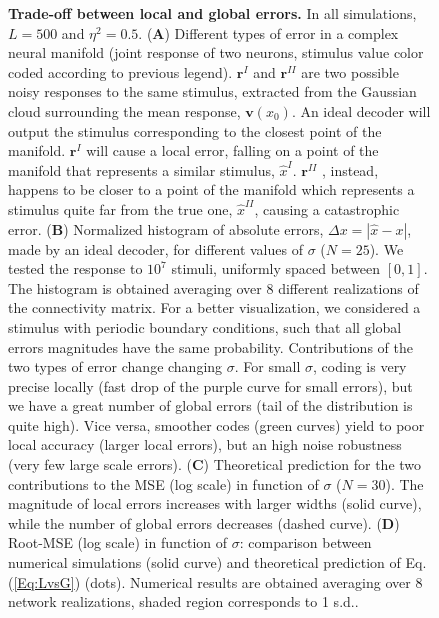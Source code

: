 \documentclass[a4paper]{article}%
\begin{document}
\begin{figure}[ptb]
\centering
{}\caption{ \textbf{Trade-off
between local and global errors.} In all simulations, $L=500$ and $\eta^{2} =
0.5$. (\textbf{A}) Different types of error in a complex neural manifold
(joint response of two neurons, stimulus value color coded according to
previous legend). $\mathbf{r}^{I}$ and $\mathbf{r}^{II}$ are two possible
noisy responses to the same stimulus, extracted from the Gaussian cloud
surrounding the mean response, $\mathbf{v}(x_{0})$. An ideal decoder will
output the stimulus corresponding to the closest point of the manifold.
$\mathbf{r}^{I}$ will cause a local error, falling on a point of the manifold
that represents a similar stimulus, $\hat{x}^{I}$. $\mathbf{r}^{II}$ ,
instead, happens to be closer to a point of the manifold which represents a
stimulus quite far from the true one, $\hat{x}^{II}$, causing a catastrophic
error. (\textbf{B}) Normalized histogram of absolute errors, $\Delta x =
|\hat{x}-x|$, made by an ideal decoder, for different values of $\sigma$
($N=25$). We tested the response to $10^{7}$ stimuli, uniformly spaced between
$[0,1]$. The histogram is obtained averaging over 8 different realizations of
the connectivity matrix. For a better visualization, we considered a stimulus
with periodic boundary conditions, such that all global errors magnitudes have
the same probability. Contributions of the two types of error change changing
$\sigma$. For small $\sigma$, coding is very precise locally (fast drop of the
purple curve for small errors), but we have a great number of global errors
(tail of the distribution is quite high). Vice versa, smoother codes (green
curves) yield to poor local accuracy (larger local errors), but an high noise
robustness (very few large scale errors). (\textbf{C}) Theoretical prediction
for the two contributions to the MSE (log scale) in function of $\sigma$
($N=30$). The magnitude of local errors increases with larger widths (solid
curve), while the number of global errors decreases (dashed curve).
(\textbf{D}) Root-MSE (log scale) in function of $\sigma$: comparison between
numerical simulations (solid curve) and theoretical prediction of
Eq.(\ref{Eq:LvsG}) (dots). Numerical results are obtained averaging over 8
network realizations, shaded region corresponds to 1 s.d..}%
\label{Fig:3}%
\end{figure}\clearpage
\end{document}
